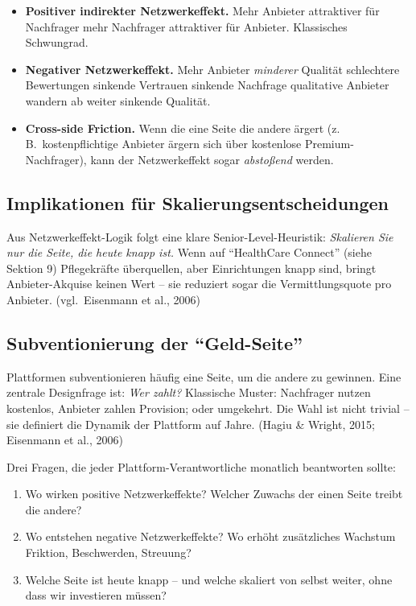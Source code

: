 \documentclass[11pt,a4paper,oneside]{article}
\newcommand{\quelle}[1]{{\footnotesize\color{lpGray}(#1)}}
\begin{document}
\begin{itemize}
  \item \textbf{Positiver indirekter Netzwerkeffekt.} Mehr Anbieter \textrightarrow{} attraktiver für Nachfrager \textrightarrow{} mehr Nachfrager \textrightarrow{} attraktiver für Anbieter. Klassisches Schwungrad.
  \item \textbf{Negativer Netzwerkeffekt.} Mehr Anbieter \emph{minderer} Qualität \textrightarrow{} schlechtere Bewertungen \textrightarrow{} sinkende Vertrauen \textrightarrow{} sinkende Nachfrage \textrightarrow{} qualitative Anbieter wandern ab \textrightarrow{} weiter sinkende Qualität.
  \item \textbf{Cross-side Friction.} Wenn die eine Seite die andere ärgert (z.\,B.\ kostenpflichtige Anbieter ärgern sich über kostenlose Premium-Nachfrager), kann der Netzwerkeffekt sogar \emph{abstoßend} werden.
\end{itemize}

\subsection{Implikationen für Skalierungsentscheidungen}

Aus Netzwerkeffekt-Logik folgt eine klare Senior-Level-Heuristik: \emph{Skalieren Sie nur die Seite, die heute knapp ist.} Wenn auf ``HealthCare Connect'' (siehe Sektion 9) Pflegekräfte überquellen, aber Einrichtungen knapp sind, bringt Anbieter-Akquise keinen Wert -- sie reduziert sogar die Vermittlungsquote pro Anbieter. \quelle{vgl.\ Eisenmann et al., 2006}

\subsection{Subventionierung der ``Geld-Seite''}

Plattformen subventionieren häufig eine Seite, um die andere zu gewinnen. Eine zentrale Designfrage ist: \emph{Wer zahlt?} Klassische Muster: Nachfrager nutzen kostenlos, Anbieter zahlen Provision; oder umgekehrt. Die Wahl ist nicht trivial -- sie definiert die Dynamik der Plattform auf Jahre. \quelle{Hagiu \& Wright, 2015; Eisenmann et al., 2006}

\begin{merkbox}
Drei Fragen, die jeder Plattform-Verantwortliche monatlich beantworten sollte:
\begin{enumerate}
  \item Wo wirken positive Netzwerkeffekte? Welcher Zuwachs der einen Seite treibt die andere?
  \item Wo entstehen negative Netzwerkeffekte? Wo erhöht zusätzliches Wachstum Friktion, Beschwerden, Streuung?
  \item Welche Seite ist heute knapp -- und welche skaliert von selbst weiter, ohne dass wir investieren müssen?
\end{enumerate}
\end{merkbox}
\end{document}
